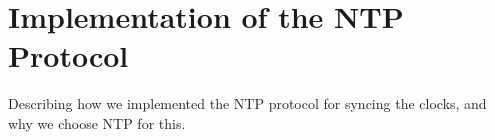 \section{Implementation of the NTP Protocol}

Describing how we implemented the NTP protocol for syncing the clocks, and why we choose NTP for this. 



